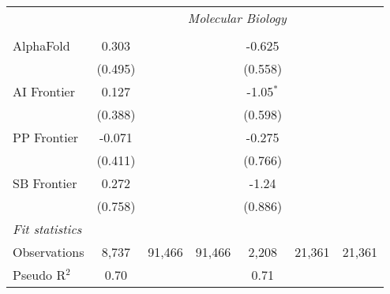 \begin{tabular}{lcccccc}
 & \multicolumn{6}{c}{\textit{Molecular Biology}} \\ \\
   AlphaFold    & 0.303    &        &        & -0.625      &        &   \\   
                & (0.495)  &        &        & (0.558)     &        &   \\   
   AI Frontier  & 0.127    &        &        & -1.05$^{*}$ &        &   \\   
                & (0.388)  &        &        & (0.598)     &        &   \\   
   PP Frontier  & -0.071   &        &        & -0.275      &        &   \\   
                & (0.411)  &        &        & (0.766)     &        &   \\   
   SB Frontier  & 0.272    &        &        & -1.24       &        &   \\   
                & (0.758)  &        &        & (0.886)     &        &   \\   
   \midrule
   \emph{Fit statistics}\\
   Observations & 8,737    & 91,466 & 91,466 & 2,208       & 21,361 & 21,361\\  
   Pseudo R$^2$ & 0.70     &        &        & 0.71        &        & \\  
   

\end{tabular}
